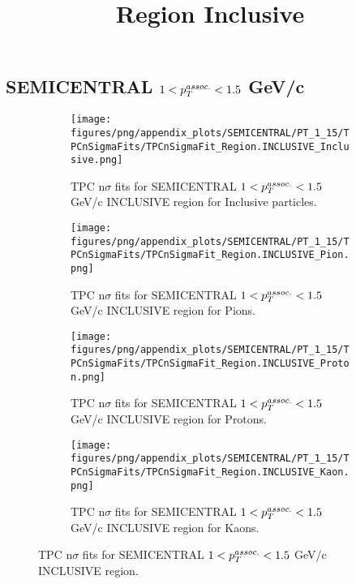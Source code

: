             \subsection{SEMICENTRAL $1 < \pTassoc < 1.5$ GeV/c}
            \begin{figure}[H]
                \title{Region Inclusive}
                \begin{subfigure}[b]{0.5\textwidth}
                    \centering
                    \texttt{[image: figures/png/appendix\_plots/SEMICENTRAL/PT\_1\_15/TPCnSigmaFits/TPCnSigmaFit\_Region.INCLUSIVE\_Inclusive.png]}
                    \caption{TPC n$\sigma$ fits for SEMICENTRAL $1 < \pTassoc < 1.5$ GeV/c INCLUSIVE region for Inclusive particles.}
                    \label{fig:appendix_SEMICENTRAL_$1 < \pTassoc < 1.5$ GeV/c_INCLUSIVE_Inclusive}
                \end{subfigure}
                \begin{subfigure}[b]{0.5\textwidth}
                    \centering
                    \texttt{[image: figures/png/appendix\_plots/SEMICENTRAL/PT\_1\_15/TPCnSigmaFits/TPCnSigmaFit\_Region.INCLUSIVE\_Pion.png]}
                    \caption{TPC n$\sigma$ fits for SEMICENTRAL $1 < \pTassoc < 1.5$ GeV/c INCLUSIVE region for Pions.}
                    \label{fig:appendix_SEMICENTRAL_$1 < \pTassoc < 1.5$ GeV/c_INCLUSIVE_Pion}
                \end{subfigure}
                \begin{subfigure}[b]{0.5\textwidth}
                    \centering
                    \texttt{[image: figures/png/appendix\_plots/SEMICENTRAL/PT\_1\_15/TPCnSigmaFits/TPCnSigmaFit\_Region.INCLUSIVE\_Proton.png]}
                    \caption{TPC n$\sigma$ fits for SEMICENTRAL $1 < \pTassoc < 1.5$ GeV/c INCLUSIVE region for Protons.}
                    \label{fig:appendix_SEMICENTRAL_$1 < \pTassoc < 1.5$ GeV/c_INCLUSIVE_Proton}
                \end{subfigure}
                \begin{subfigure}[b]{0.5\textwidth}
                    \centering
                    \texttt{[image: figures/png/appendix\_plots/SEMICENTRAL/PT\_1\_15/TPCnSigmaFits/TPCnSigmaFit\_Region.INCLUSIVE\_Kaon.png]}
                    \caption{TPC n$\sigma$ fits for SEMICENTRAL $1 < \pTassoc < 1.5$ GeV/c INCLUSIVE region for Kaons.}
                    \label{fig:appendix_SEMICENTRAL_$1 < \pTassoc < 1.5$ GeV/c_INCLUSIVE_Kaon}
                \end{subfigure}
                \caption{TPC n$\sigma$ fits for SEMICENTRAL $1 < \pTassoc < 1.5$ GeV/c INCLUSIVE region.}
                \label{fig:appendix_SEMICENTRAL_$1 < \pTassoc < 1.5$ GeV/c_INCLUSIVE}
            \end{figure}
